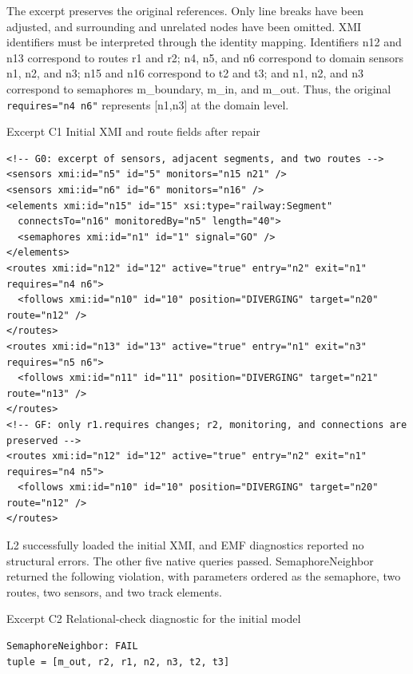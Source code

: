 \documentclass[pdflatex,iicol,sn-mathphys-num]{sn-jnl}
\begin{document}
The excerpt preserves the original references. Only line breaks have been adjusted, and surrounding and unrelated nodes have been omitted. XMI identifiers must be interpreted through the identity mapping. Identifiers n12 and n13 correspond to routes r1 and r2; n4, n5, and n6 correspond to domain sensors n1, n2, and n3; n15 and n16 correspond to t2 and t3; and n1, n2, and n3 correspond to semaphores m\_boundary, m\_in, and m\_out. Thus, the original \texttt{requires="n4 n6"} represents [n1,n3] at the domain level.


\par\noindent\begin{minipage}{\columnwidth}
Excerpt C1 Initial XMI and route fields after repair\par
\begin{Verbatim}[fontsize=\footnotesize,breaklines=true,breakanywhere=true,breaksymbolleft={},frame=lines,framesep=3mm,rulecolor=\color{lightgray}]
<!-- G0: excerpt of sensors, adjacent segments, and two routes -->
<sensors xmi:id="n5" id="5" monitors="n15 n21" />
<sensors xmi:id="n6" id="6" monitors="n16" />
<elements xmi:id="n15" id="15" xsi:type="railway:Segment"
  connectsTo="n16" monitoredBy="n5" length="40">
  <semaphores xmi:id="n1" id="1" signal="GO" />
</elements>
<routes xmi:id="n12" id="12" active="true" entry="n2" exit="n1" requires="n4 n6">
  <follows xmi:id="n10" id="10" position="DIVERGING" target="n20" route="n12" />
</routes>
<routes xmi:id="n13" id="13" active="true" entry="n1" exit="n3" requires="n5 n6">
  <follows xmi:id="n11" id="11" position="DIVERGING" target="n21" route="n13" />
</routes>
<!-- GF: only r1.requires changes; r2, monitoring, and connections are preserved -->
<routes xmi:id="n12" id="12" active="true" entry="n2" exit="n1" requires="n4 n5">
  <follows xmi:id="n10" id="10" position="DIVERGING" target="n20" route="n12" />
</routes>
\end{Verbatim}
\end{minipage}\par

L2 successfully loaded the initial XMI, and EMF diagnostics reported no structural errors. The other five native queries passed. SemaphoreNeighbor returned the following violation, with parameters ordered as the semaphore, two routes, two sensors, and two track elements.


\par\noindent\begin{minipage}{\columnwidth}
Excerpt C2 Relational-check diagnostic for the initial model\par
\begin{Verbatim}[fontsize=\footnotesize,breaklines=true,breakanywhere=true,breaksymbolleft={},frame=lines,framesep=3mm,rulecolor=\color{lightgray}]
SemaphoreNeighbor: FAIL
tuple = [m_out, r2, r1, n2, n3, t2, t3]
\end{Verbatim}
\end{minipage}\par
\end{document}
